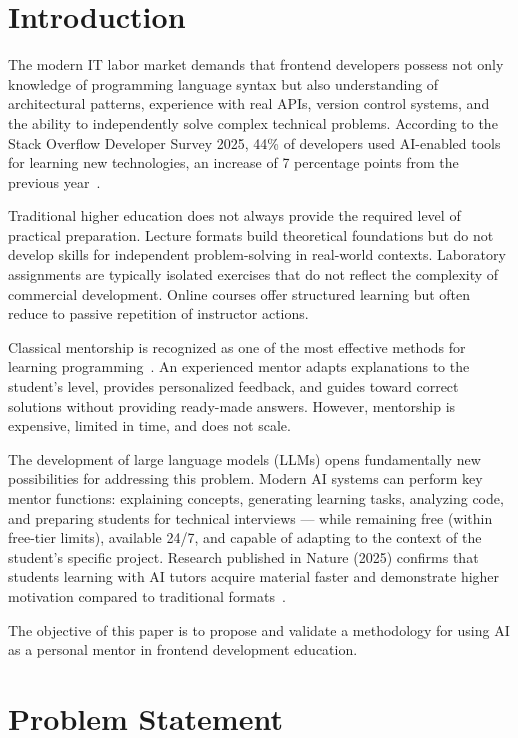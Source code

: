 \documentclass[conference,a4paper]{IEEEtran}
\begin{document}
\section{Introduction}

The modern IT labor market demands that frontend developers possess not only knowledge of programming language syntax but also understanding of architectural patterns, experience with real APIs, version control systems, and the ability to independently solve complex technical problems. According to the Stack Overflow Developer Survey 2025, 44\% of developers used AI-enabled tools for learning new technologies, an increase of 7 percentage points from the previous year~\cite{stackoverflow2025}.

Traditional higher education does not always provide the required level of practical preparation. Lecture formats build theoretical foundations but do not develop skills for independent problem-solving in real-world contexts. Laboratory assignments are typically isolated exercises that do not reflect the complexity of commercial development. Online courses offer structured learning but often reduce to passive repetition of instructor actions.

Classical mentorship is recognized as one of the most effective methods for learning programming~\cite{begel2008}. An experienced mentor adapts explanations to the student's level, provides personalized feedback, and guides toward correct solutions without providing ready-made answers. However, mentorship is expensive, limited in time, and does not scale.

The development of large language models (LLMs) opens fundamentally new possibilities for addressing this problem. Modern AI systems can perform key mentor functions: explaining concepts, generating learning tasks, analyzing code, and preparing students for technical interviews --- while remaining free (within free-tier limits), available 24/7, and capable of adapting to the context of the student's specific project. Research published in Nature (2025) confirms that students learning with AI tutors acquire material faster and demonstrate higher motivation compared to traditional formats~\cite{nature2025}.

The objective of this paper is to propose and validate a methodology for using AI as a personal mentor in frontend development education.

\section{Problem Statement}
\end{document}
